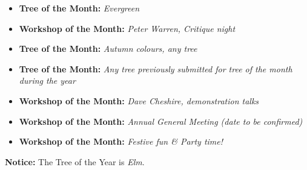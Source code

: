 \medskip
{}
\begin{itemize}
    \item \textbf{Tree of the Month:} \textit{Evergreen}
    \item \textbf{Workshop of the Month:} \textit{\textit{Peter Warren,} Critique night}
\end{itemize}

\medskip
{}
\begin{itemize}
    \item \textbf{Tree of the Month:} \textit{Autumn colours, any tree}
\end{itemize}

\medskip
{}
\begin{itemize}
    \item \textbf{Tree of the Month:} \textit{Any tree previously submitted for tree of the month during the year}
    \item \textbf{Workshop of the Month:} \textit{\textit{Dave Cheshire,} demonstration talks}
\end{itemize}

\medskip
{}
\begin{itemize}
    \item \textbf{Workshop of the Month:} \textit{Annual General Meeting (date to be confirmed)}
\end{itemize}

\medskip
{}
\begin{itemize}
    \item \textbf{Workshop of the Month:} \textit{Festive fun \& Party time!}
\end{itemize}

\noindent
\textbf{Notice:} The Tree of the Year is \textit{Elm}.

\closearticle



